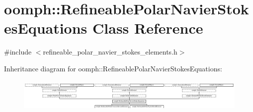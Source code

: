 \hypertarget{classoomph_1_1RefineablePolarNavierStokesEquations}{}\section{oomph\+:\+:Refineable\+Polar\+Navier\+Stokes\+Equations Class Reference}
\label{classoomph_1_1RefineablePolarNavierStokesEquations}


{\ttfamily \#include $<$refineable\+\_\+polar\+\_\+navier\+\_\+stokes\+\_\+elements.\+h$>$}

Inheritance diagram for oomph\+:\+:Refineable\+Polar\+Navier\+Stokes\+Equations\+:\begin{figure}[H]
\begin{center}
\leavevmode
\includegraphics[height=1.626016cm]{classoomph_1_1RefineablePolarNavierStokesEquations}
\end{center}
\end{figure}

